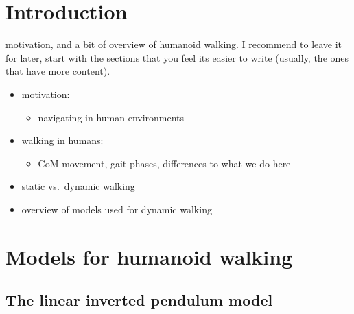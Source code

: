 \documentclass[english,ngerman]{KITreprt}
\newcommand{\clr}[2]{{\color{#1}{#2}}}
\newcommand{\todo}[1]{\marginpar{\clr{red}{#1}}}
\begin{document}



\maketitle

\tableofcontents

\chapter{Introduction}\label{introduction}

motivation, and a bit of overview of humanoid walking. I recommend to
leave it for later, start with the sections that you feel its easier to
write (usually, the ones that have more content).

\begin{itemize}
\itemsep1pt\parskip0pt
\item
  motivation:

  \begin{itemize}
  \itemsep1pt\parskip0pt
  \item
    navigating in human environments
  \end{itemize}
\item
  walking in humans:

  \begin{itemize}
  \itemsep1pt\parskip0pt
  \item
    CoM movement, gait phases, differences to what we do here
  \end{itemize}
\item
  static vs.~dynamic walking
\item
  overview of models used for dynamic walking
\end{itemize}

\chapter{Models for humanoid walking}\label{models-for-humanoid-walking}

\section{The linear inverted pendulum
model}\label{the-linear-inverted-pendulum-model}

\todo{Use different name for CoM, $p$ will be rather used for the ZMP, maybe $c$?}
\end{document}

